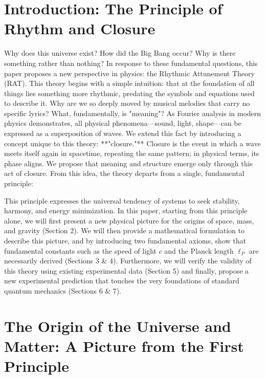 \documentclass[11pt,a4paper]{article}
\newcommand{\lp}{\ell_P}
\begin{document}
\section{Introduction: The Principle of Rhythm and Closure}
Why does this universe exist? How did the Big Bang occur? Why is there something rather than nothing? In response to these fundamental questions, this paper proposes a new perspective in physics: the Rhythmic Attunement Theory (RAT).
This theory begins with a simple intuition: that at the foundation of all things lies something more rhythmic, predating the symbols and equations used to describe it. Why are we so deeply moved by musical melodies that carry no specific lyrics? What, fundamentally, is "meaning"?
As Fourier analysis in modern physics demonstrates, all physical phenomena—sound, light, shape—can be expressed as a superposition of waves. We extend this fact by introducing a concept unique to this theory: **"closure."** Closure is the event in which a wave meets itself again in spacetime, repeating the same pattern; in physical terms, its phase aligns. We propose that meaning and structure emerge only through this act of closure.
From this idea, the theory departs from a single, fundamental principle:
\begin{center}
\end{center}
This principle expresses the universal tendency of systems to seek stability, harmony, and energy minimization.
In this paper, starting from this principle alone, we will first present a new physical picture for the origins of space, mass, and gravity (Section 2). We will then provide a mathematical formulation to describe this picture, and by introducing two fundamental axioms, show that fundamental constants such as the speed of light $c$ and the Planck length $\lp$ are necessarily derived (Sections 3 \& 4). Furthermore, we will verify the validity of this theory using existing experimental data (Section 5) and finally, propose a new experimental prediction that touches the very foundations of standard quantum mechanics (Sections 6 \& 7).

\section{The Origin of the Universe and Matter: A Picture from the First Principle}
\end{document}
